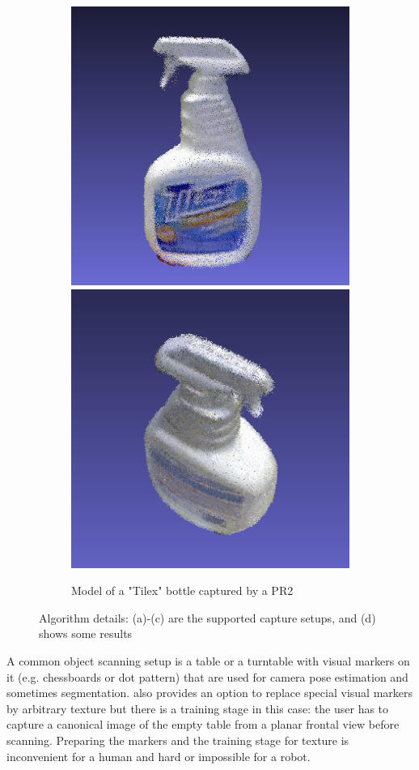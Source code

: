 \documentclass[letterpaper, 10 pt, conference]{ieeeconf}  %
\begin{document}
\begin{figure}[t]
        \begin{subfigure}[b]{\linewidth}
                \centering
                \includegraphics[width=0.49\linewidth]{../tizer/tilexFrontal.png}
                \includegraphics[width=0.49\linewidth]{../tizer/tilexTop.png}
                \caption{Model of a "Tilex" bottle captured by a PR2}
        \end{subfigure}
        \caption{Algorithm details: (a)-(c) are the supported 
        capture setups, and (d) shows some results}
        \label{fig:tizer}
\end{figure}


A common object scanning setup is a table or a turntable with
visual markers on it (e.g. chessboards or dot pattern) that
are used for camera pose estimation and sometimes segmentation.
\cite{ectoObjectRecognitionCapture} also 
provides an option to replace special visual markers by arbitrary texture but
there is a training stage in this case:
the user has to capture a canonical image of the empty table from
a planar frontal view before scanning. Preparing the markers
and the training stage for texture is inconvenient for a human and
hard or impossible for a robot. 
\end{document}
